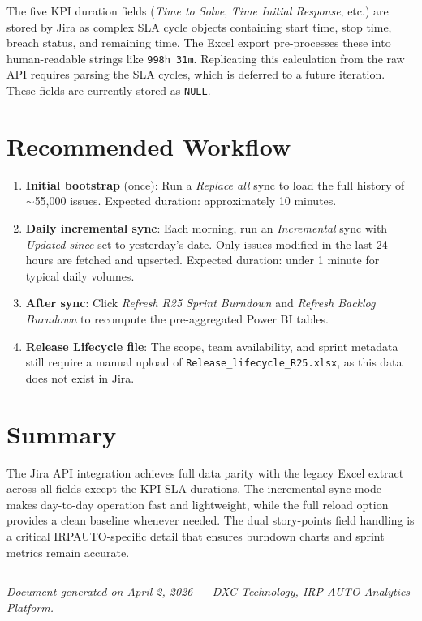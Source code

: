 \documentclass[12pt, a4paper]{article}
\begin{document}
The five KPI duration fields (\textit{Time to Solve}, \textit{Time Initial Response}, etc.)
are stored by Jira as complex SLA cycle objects containing start time, stop time,
breach status, and remaining time. The Excel export pre-processes these into human-readable
strings like \texttt{998h 31m}. Replicating this calculation from the raw API requires
parsing the SLA cycles, which is deferred to a future iteration. These fields are currently
stored as \texttt{NULL}.

\section{Recommended Workflow}

\begin{enumerate}
    \item \textbf{Initial bootstrap} (once): Run a \textit{Replace all} sync to load the
          full history of $\sim$55,000 issues. Expected duration: approximately 10 minutes.
    \item \textbf{Daily incremental sync}: Each morning, run an \textit{Incremental} sync
          with \textit{Updated since} set to yesterday's date. Only issues modified in the
          last 24 hours are fetched and upserted. Expected duration: under 1 minute for
          typical daily volumes.
    \item \textbf{After sync}: Click \textit{Refresh R25 Sprint Burndown} and
          \textit{Refresh Backlog Burndown} to recompute the pre-aggregated Power BI tables.
    \item \textbf{Release Lifecycle file}: The scope, team availability, and sprint metadata
          still require a manual upload of \texttt{Release\_lifecycle\_R25.xlsx}, as this
          data does not exist in Jira.
\end{enumerate}

\section{Summary}

The Jira API integration achieves full data parity with the legacy Excel extract across all
fields except the KPI SLA durations. The incremental sync mode makes day-to-day operation
fast and lightweight, while the full reload option provides a clean baseline whenever needed.
The dual story-points field handling is a critical IRPAUTO-specific detail that ensures
burndown charts and sprint metrics remain accurate.

\vspace{1cm}
\noindent\rule{\linewidth}{0.4pt}
{\small\textit{Document generated on April 2, 2026 — DXC Technology, IRP AUTO Analytics Platform.}}
\end{document}
